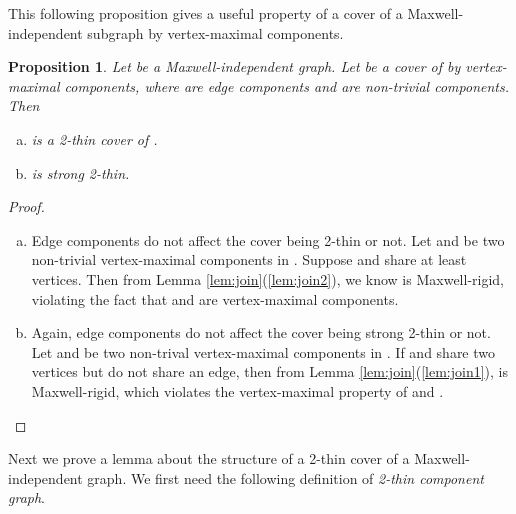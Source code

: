 \documentclass[10pt]{article}
\newtheorem{obs}{Proposition}
\begin{document}
This following proposition gives a useful property of a cover of a Maxwell-independent subgraph by vertex-maximal components.
\begin{obs}\label{obs:vmmr}
Let  be a Maxwell-independent graph. Let   be a cover of  by vertex-maximal components, where  are edge components and  are non-trivial components. Then
\begin{enumerate}[(a)]
\item\label{obs:vmmr1}  is a 2-thin cover of .
\item\label{obs:vmmr2}  is strong 2-thin.

\begin{comment}
\item\label{obs:vmmr3} Suppose  is the {\em complete} collection of vertex-maximal components of . Let  be a maximal independent set of  and extend  to a maximal independent set  of . Let . Then for each edge  in , there exists at least one non-trivial component  such that  and .
Denote by  the set of edges of  both of whose endpoints are in .
Then we have 
\end{comment}
\end{enumerate}
\end{obs}
\begin{proof}
\begin{enumerate}[(a)]
\item Edge components do not affect the cover being 2-thin or not. 
Let  and  be two non-trivial vertex-maximal components in . Suppose  and  share at least  vertices. Then from Lemma \ref{lem:join}(\ref{lem:join2}), we know    is Maxwell-rigid, violating the fact that  and  are vertex-maximal components.


\item  Again, edge components do not affect the cover being strong 2-thin or not. Let  and  be two non-trival vertex-maximal components in . If  and  share two vertices but do not share an edge, then from Lemma \ref{lem:join}(\ref{lem:join1}),    is Maxwell-rigid, which violates the vertex-maximal property of  and .





\end{enumerate}
\end{proof}




\medskip\noindent
Next we prove a lemma about the structure of a 2-thin cover of a Maxwell-independent graph.
We first need the following definition of {\em 2-thin component graph}.
\end{document}
